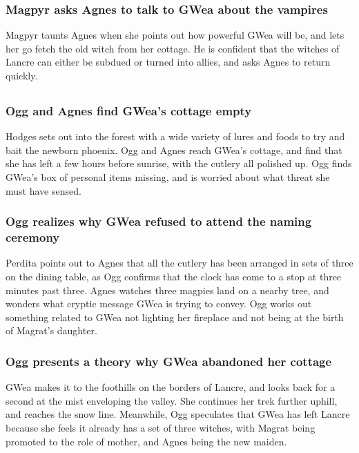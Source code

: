 \subsubsection{\Gls{Magpyr} asks \Gls{Agnes} to talk to \Gls{GWea} about the vampires}
\Gls{Magpyr} taunts \Gls{Agnes} when she points out how powerful \Gls{GWea} will be, and lets her
go fetch the old witch from her cottage. He is confident that the witches of Lancre can either be
subdued or turned into allies, and asks \Gls{Agnes} to return quickly.

\subsection{}
\subsubsection{\Gls{Ogg} and \Gls{Agnes} find \Gls{GWea}'s cottage empty}
\Gls{Hodges} sets out into the forest with a wide variety of lures and foods to try and bait the
newborn phoenix. \Gls{Ogg} and \Gls{Agnes} reach \Gls{GWea}'s cottage, and find that she has left
a few hours before sunrise, with the cutlery all polished up. \Gls{Ogg} finds \Gls{GWea}'s box of
personal items missing, and is worried about what threat she must have sensed.

\subsubsection{\Gls{Ogg} realizes why \Gls{GWea} refused to attend the naming ceremony}
\Gls{Perdita} points out to \Gls{Agnes} that all the cutlery has been arranged in sets of three on
the dining table, as \Gls{Ogg} confirms that the clock has come to a stop at three minutes past
three. \Gls{Agnes} watches three magpies land on a nearby tree, and wonders what cryptic message
\Gls{GWea} is trying to convey. \Gls{Ogg} works out something related to \Gls{GWea} not lighting
her fireplace and not being at the birth of \Gls{Magrat}'s daughter.

\subsubsection{\Gls{Ogg} presents a theory why \Gls{GWea} abandoned her cottage}
\Gls{GWea} makes it to the foothills on the borders of Lancre, and looks back for a second at the
mist enveloping the valley. She continues her trek further uphill, and reaches the snow line.
Meanwhile, \Gls{Ogg} speculates that \Gls{GWea} has left Lancre because she feels it already has a
set of three witches, with \Gls{Magrat} being promoted to the role of mother, and \Gls{Agnes} being
the new maiden.


